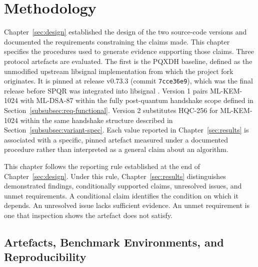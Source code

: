 \section{Methodology}
\label{sec:methodology}
Chapter~\ref{sec:design} established the design of the two source-code versions and documented the requirements constraining the claims made. This chapter specifies the procedures used to generate evidence supporting those claims. Three protocol artefacts are evaluated. The first is the PQXDH baseline, defined as the unmodified upstream libsignal implementation from which the project fork originates. It is pinned at release v0.73.3 (commit \texttt{7cce36e9}), which was the final release before SPQR was integrated into libsignal \cite{noauthor_release_nodate,noauthor_release_nodate-2}. Version 1 pairs ML-KEM-1024 with ML-DSA-87 within the fully post-quantum handshake scope defined in Section~\ref{subsubsec:req-functional}. Version 2 substitutes HQC-256 for ML-KEM-1024 within the same handshake structure described in Section~\ref{subsubsec:variant-spec}. Each value reported in Chapter~\ref{sec:results} is associated with a specific, pinned artefact measured under a documented procedure rather than interpreted as a general claim about an algorithm.

This chapter follows the reporting rule established at the end of Chapter~\ref{sec:design}. Under this rule, Chapter~\ref{sec:results} distinguishes demonstrated findings, conditionally supported claims, unresolved issues, and unmet requirements. A conditional claim identifies the condition on which it depends. An unresolved issue lacks sufficient evidence. An unmet requirement is one that inspection shows the artefact does not satisfy.

\subsection{Artefacts, Benchmark Environments, and Reproducibility}
\label{subsec:environment}

